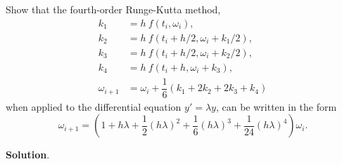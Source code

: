 \documentclass[11pt]{article}
\theoremstyle{break}
\numberwithin{equation}{theorem}
\begin{document}
\newpage
\begin{problem}\label{problem 19} %
    Show that the fourth-order Runge-Kutta method, 
    \begin{align*}
        k_1&=h\:f(t_i, \omega_i),\\
        k_2&=h\:f(t_i+h/2, \omega_i+k_1/2),\\
        k_3&=h\:f(t_i+h/2, \omega_i+k_2/2),\\
        k_4&=h\:f(t_i+h, \omega_i+k_3),\\
        \omega_{i+1}&=\omega_{i}+\dfrac{1}{6}\left(k_1+2k_2+2k_3+k_4\right)
    \end{align*}
    when applied to the differential equation $y'=\lambda y$, can be written in the form $$\omega_{i+1}=\left(1+h\lambda+\dfrac{1}{2}(h\lambda)^2+\dfrac{1}{6}(h\lambda)^3+\dfrac{1}{24}(h\lambda)^4\right)\omega_{i}.$$
\end{problem}
\textbf{Solution}.
\end{document}
